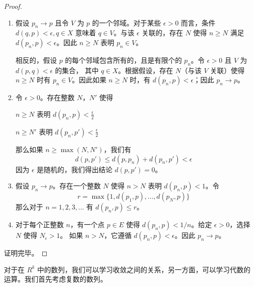 \documentclass[../poma-notes.tex]{subfiles}
\begin{document}
\begin{proof}
  \begin{enumerate}[label=(\alph*)]
    \item 假设 $p_n \to p$ 且令 $V$ 为 $p$ 的一个邻域。对于某些 $\epsilon > 0$ 而言，条件 $d(q,p)<\epsilon,q\in X$ 意味着
          $q \in V$。与该 $\epsilon$ 关联的，存在 $N$ 使得 $n \ge N$ 满足 $d(p_n,p) < \epsilon$。因此 $n \ge N$ 表明
          $p_n \in V$。

          相反的，假设 $p$ 的每个邻域包含所有的，且是有限个的 $p_n$。令 $\epsilon > 0$ 且 $V$ 为 $d(p,q)<\epsilon$ 的集合，
          其中 $q \in X$。根据假设，存在 $N$（与该 $V$ 关联）使得 $n \ge N$ 时有 $p_n \in V$。因此如果 $n \ge N$ 时，有
          $d(p_n,p) < \epsilon$；因此 $p_n \to p$。
    \item 令 $\epsilon > 0$。存在整数 $N$，$N'$ 使得
          \begin{center}
            $n \ge N $ 表明 $d(p_n,p)<\frac{\epsilon}{2}$
          \end{center}
          \begin{center}
            $n \ge N' $ 表明 $d(p_n,p')<\frac{\epsilon}{2}$
          \end{center}
          那么如果 $n \ge \max(N, N')$，我们有
          \[d(p,p') \le d(p,p_n) + d(p_n,p') < \epsilon\]
          因为 $\epsilon$ 是随机的，我们得出结论 $d(p,p') = 0$。
    \item 假设 $p_n \to p$。存在一个整数 $N$ 使得 $n > N$ 表明 $d(p_n,p) < 1$。令
          \[r = \max \{1, d(p_1,p), \dots, d(p_N,p)\}\]
          那么对于 $n=1,2,3,\dots$ 有 $d(p_n, p) \le r$。
    \item 对于每个正整数 $n$，有一个点 $p \in E$ 使得 $d(p_n,p)<1/n$。给定 $\epsilon>0$，选择 $N$ 使得 $N_{\epsilon}>1$。
          如果 $n > N$，它遵循 $d(p_n,p) < \epsilon$。因此 $p_n \to p$。
  \end{enumerate}
  证明完毕。
\end{proof}

对于在 $R^k$ 中的数列，我们可以学习收敛之间的关系，另一方面，可以学习代数的运算。我们首先考虑复数的数列。
\end{document}
